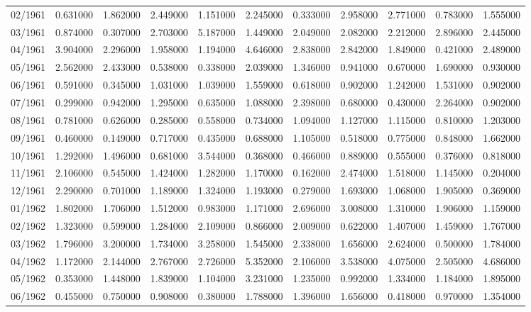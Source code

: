 \begin{tabular}{lrrrrrrrrrr}
02/1961 & 0.631000 & 1.862000 & 2.449000 & 1.151000 & 2.245000 & 0.333000 & 2.958000 & 2.771000 & 0.783000 & 1.555000 \\
03/1961 & 0.874000 & 0.307000 & 2.703000 & 5.187000 & 1.449000 & 2.049000 & 2.082000 & 2.212000 & 2.896000 & 2.445000 \\
04/1961 & 3.904000 & 2.296000 & 1.958000 & 1.194000 & 4.646000 & 2.838000 & 2.842000 & 1.849000 & 0.421000 & 2.489000 \\
05/1961 & 2.562000 & 2.433000 & 0.538000 & 0.338000 & 2.039000 & 1.346000 & 0.941000 & 0.670000 & 1.690000 & 0.930000 \\
06/1961 & 0.591000 & 0.345000 & 1.031000 & 1.039000 & 1.559000 & 0.618000 & 0.902000 & 1.242000 & 1.531000 & 0.902000 \\
07/1961 & 0.299000 & 0.942000 & 1.295000 & 0.635000 & 1.088000 & 2.398000 & 0.680000 & 0.430000 & 2.264000 & 0.902000 \\
08/1961 & 0.781000 & 0.626000 & 0.285000 & 0.558000 & 0.734000 & 1.094000 & 1.127000 & 1.115000 & 0.810000 & 1.203000 \\
09/1961 & 0.460000 & 0.149000 & 0.717000 & 0.435000 & 0.688000 & 1.105000 & 0.518000 & 0.775000 & 0.848000 & 1.662000 \\
10/1961 & 1.292000 & 1.496000 & 0.681000 & 3.544000 & 0.368000 & 0.466000 & 0.889000 & 0.555000 & 0.376000 & 0.818000 \\
11/1961 & 2.106000 & 0.545000 & 1.424000 & 1.282000 & 1.170000 & 0.162000 & 2.474000 & 1.518000 & 1.145000 & 0.204000 \\
12/1961 & 2.290000 & 0.701000 & 1.189000 & 1.324000 & 1.193000 & 0.279000 & 1.693000 & 1.068000 & 1.905000 & 0.369000 \\
01/1962 & 1.802000 & 1.706000 & 1.512000 & 0.983000 & 1.171000 & 2.696000 & 3.008000 & 1.310000 & 1.906000 & 1.159000 \\
02/1962 & 1.323000 & 0.599000 & 1.284000 & 2.109000 & 0.866000 & 2.009000 & 0.622000 & 1.407000 & 1.459000 & 1.767000 \\
03/1962 & 1.796000 & 3.200000 & 1.734000 & 3.258000 & 1.545000 & 2.338000 & 1.656000 & 2.624000 & 0.500000 & 1.784000 \\
04/1962 & 1.172000 & 2.144000 & 2.767000 & 2.726000 & 5.352000 & 2.106000 & 3.538000 & 4.075000 & 2.505000 & 4.686000 \\
05/1962 & 0.353000 & 1.448000 & 1.839000 & 1.104000 & 3.231000 & 1.235000 & 0.992000 & 1.334000 & 1.184000 & 1.895000 \\
06/1962 & 0.455000 & 0.750000 & 0.908000 & 0.380000 & 1.788000 & 1.396000 & 1.656000 & 0.418000 & 0.970000 & 1.354000 \\

\end{tabular}
